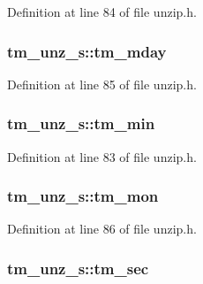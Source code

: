 Definition at line 84 of file unzip.\-h.

\hypertarget{structtm__unz__s_a51ed1873e1dcabf08ff0f85caf8aefee}{
\subsubsection[{tm\-\_\-mday}]{ tm\-\_\-unz\-\_\-s\-::tm\-\_\-mday}}\label{structtm__unz__s_a51ed1873e1dcabf08ff0f85caf8aefee}


Definition at line 85 of file unzip.\-h.

\hypertarget{structtm__unz__s_ac5a6bf08a4c5db8ae2243d4f0c35b192}{
\subsubsection[{tm\-\_\-min}]{ tm\-\_\-unz\-\_\-s\-::tm\-\_\-min}}\label{structtm__unz__s_ac5a6bf08a4c5db8ae2243d4f0c35b192}


Definition at line 83 of file unzip.\-h.

\hypertarget{structtm__unz__s_a4f5e461d8cad18d1aff7ec012168111d}{
\subsubsection[{tm\-\_\-mon}]{ tm\-\_\-unz\-\_\-s\-::tm\-\_\-mon}}\label{structtm__unz__s_a4f5e461d8cad18d1aff7ec012168111d}


Definition at line 86 of file unzip.\-h.

\hypertarget{structtm__unz__s_ab91e69a9869e5db5be51b1aebaa5ea0d}{
\subsubsection[{tm\-\_\-sec}]{ tm\-\_\-unz\-\_\-s\-::tm\-\_\-sec}}\label{structtm__unz__s_ab91e69a9869e5db5be51b1aebaa5ea0d}


